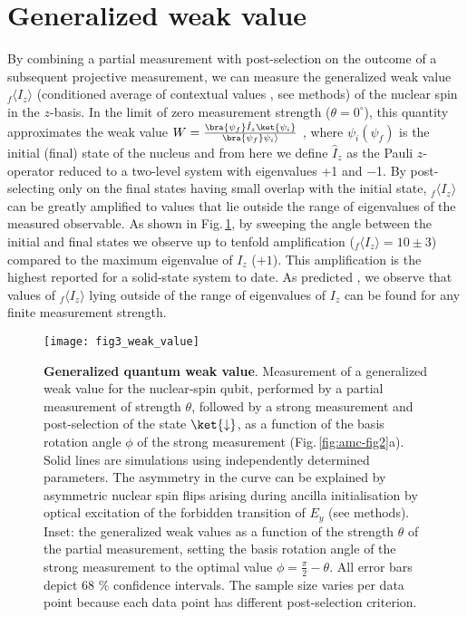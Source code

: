 \section{Generalized weak value}
By combining a partial measurement with post-selection on the outcome of a subsequent projective measurement, we can measure the generalized weak value $_{f} \langle I_{z} \rangle$ (conditioned average of contextual values \cite{Dressel_PRL_2010}, see methods) of the nuclear spin in the $z$-basis. In the limit of zero measurement strength ($\theta = 0^{\circ}$), this quantity approximates the weak value \cite{Aharonov_PRL_1988} $W = \frac{\bra{\psi_f} \hat{I}_z \ket{\psi_i}}{\bra{\psi_f} \psi_i \rangle}$ , where $ \psi_i (\psi_f )$ is the initial (final) state of the nucleus and from here we define $\hat{I}_z$ as the Pauli $z$-operator reduced to a two-level system with eigenvalues +1 and $-$1. By post-selecting only on the final states having small overlap with the initial state, $_{f} \langle I_{z} \rangle$ can be greatly amplified to values that lie outside the range of eigenvalues of the measured observable. As shown in Fig.\,\ref{fig:amc-fig3}, by sweeping the angle between the initial and final states we observe up to tenfold amplification ($_{f} \langle I_{z} \rangle = 10 \pm 3$) compared to the maximum eigenvalue of $I_{z}$ ($+1$). This amplification is the highest reported for a solid-state system to date\cite{Groen_PRL_2013}. As predicted \cite{Williams_PRL_2008}, we observe that values of  $_{f} \langle I_{z} \rangle$ lying outside of the range of eigenvalues of $I_{z}$ can be found for any finite measurement strength.

\begin{figure}
	\centering
	\texttt{[image: fig3\_weak\_value]}
	\caption{\label{fig:amc-fig3} \textbf{Generalized quantum weak value}. Measurement of a generalized weak value for the nuclear-spin qubit, performed by a partial measurement of strength $\theta$, followed by a strong measurement and post-selection of the state  $\ket{\downarrow}$, as a function of the basis rotation angle $\phi$ of the strong measurement (Fig.\,\ref{fig:amc-fig2}a). Solid lines are simulations using independently determined parameters. The asymmetry in the curve can be explained by asymmetric nuclear spin flips arising during ancilla initialisation by optical excitation of the forbidden transition of $E_{y}$ (see methods). Inset: the generalized weak values as a function of the strength $\theta$ of the partial measurement, setting the basis rotation angle of the strong measurement to the optimal value  $\phi = \frac{\pi}{2} - \theta$. All error bars depict 68 $\%$ confidence intervals. The sample size varies per data point because each data point has different post-selection criterion.}
\end{figure}

